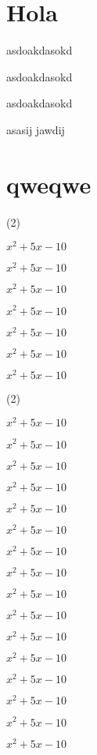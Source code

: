 \documentclass[]{plantilla-material-v1}
\begin{document}
\section{Hola}
\lipsum[2]
\begin{lista}
  \item asdoakdasokd
  \item asdoakdasokd
  \item asdoakdasokd
\end{lista}
asasij jawdij
\section{}
\lipsum[1-2]
\section{qweqwe}
 \begin{ejercicios}(2)
   \item $x^2+5x-10$
   \item $x^2+5x-10$
   \item $x^2+5x-10$
   \item $x^2+5x-10$
   \item $x^2+5x-10$
   \item $x^2+5x-10$
   \item $x^2+5x-10$
 \end{ejercicios}

 \lipsum[1]
 \begin{ejercicios}[resume](2)
  \item $x^2+5x-10$
  \item $x^2+5x-10$
  \item $x^2+5x-10$
  \item $x^2+5x-10$
  \item $x^2+5x-10$
  \item $x^2+5x-10$
  \item $x^2+5x-10$
  \item $x^2+5x-10$
  \item $x^2+5x-10$
  \item $x^2+5x-10$
  \item $x^2+5x-10$
  \item $x^2+5x-10$
  \item $x^2+5x-10$
  \item $x^2+5x-10$
  \item $x^2+5x-10$
  \item $x^2+5x-10$
\end{ejercicios}

\lipsum[1]
\lipsum[1-8]
\end{document}
